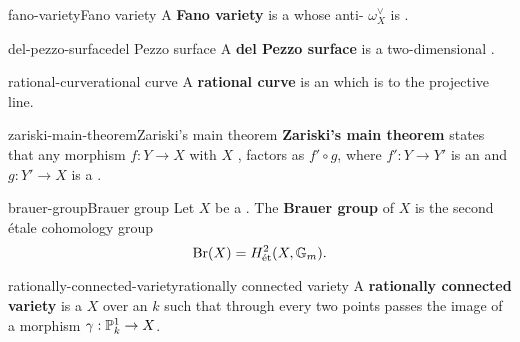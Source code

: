 \begin{topic}{fano-variety}{Fano variety}
    A \textbf{Fano variety} is a  whose anti- $\omega_X^\vee$ is .
\end{topic}

\begin{topic}{del-pezzo-surface}{del Pezzo surface}
    A \textbf{del Pezzo surface} is a two-dimensional .
\end{topic}


\begin{topic}{rational-curve}{rational curve}
    A \textbf{rational curve} is an  which is  to the projective line.
\end{topic}

\begin{topic}{zariski-main-theorem}{Zariski's main theorem}
    \textbf{Zariski's main theorem} states that any   morphism $f : Y \to X$ with $X$ , factors as $f' \circ g$, where $f' : Y \to Y'$ is an  and $g : Y' \to X$ is a .
\end{topic}

\begin{topic}{brauer-group}{Brauer group}
    Let $X$ be a . The \textbf{Brauer group} of $X$ is the second étale cohomology group
    \[ \textup{Br}(X) = H^2_\textup{ét}(X, \mathbb{G}_m) . \]
\end{topic}

\begin{topic}{rationally-connected-variety}{rationally connected variety}
    A \textbf{rationally connected variety} is a  $X$ over an  $k$ such that through every two points passes the image of a morphism $\gamma : \mathbb{P}^1_k \to X$.
\end{topic}

